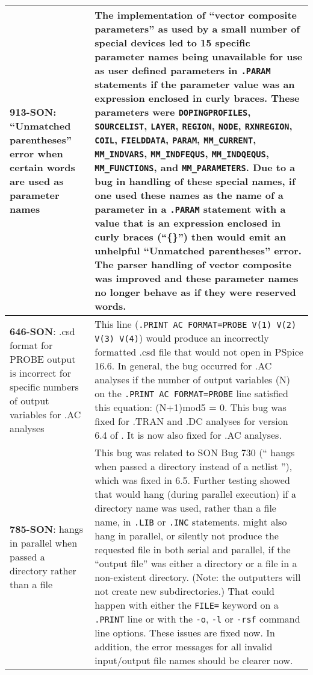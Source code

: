 {\begin{longtable}[h] {>{\raggedright\small}m{2in}|>{\raggedright\let\\\tabularnewline\small}m{3.5in}}
     \textbf{913-SON}: ``Unmatched parentheses'' error when certain words are
     used as parameter names & The implementation of ``vector composite
     parameters'' as used by a small number of special devices led to 15
     specific parameter names being unavailable for use as user defined
     parameters in \texttt{.PARAM} statements if the parameter value was an
     expression enclosed in curly braces.  These parameters were
     \texttt{DOPINGPROFILES}, \texttt{SOURCELIST}, \texttt{LAYER},
     \texttt{REGION}, \texttt{NODE}, \texttt{RXNREGION}, \texttt{COIL},
     \texttt{FIELDDATA}, \texttt{PARAM}, \texttt{MM\_CURRENT},
     \texttt{MM\_INDVARS}, \texttt{MM\_INDFEQUS}, \texttt{MM\_INDQEQUS},
     \texttt{MM\_FUNCTIONS}, and \texttt{MM\_PARAMETERS}.  Due to a bug in
     handling of these special names, if one used these names as the name of a
     parameter in a \texttt{.PARAM} statement with a value that is an
     expression enclosed in curly braces (``\{\}'') then \Xyce{} would emit an
     unhelpful ``Unmatched parentheses'' error.  The parser handling of vector
     composite was improved and these parameter names no longer behave as if
     they were reserved words.  \\ \hline

     \textbf{646-SON}: .csd format for PROBE output is incorrect for specific numbers of 
     output variables for .AC analyses  & This line (\texttt{.PRINT AC FORMAT=PROBE V(1) V(2) V(3) V(4)}) 
     would produce an incorrectly formatted .csd file that would not open in PSpice 16.6. In 
     general, the bug occurred for .AC analyses if the number of output variables (N) 
     on the \texttt{.PRINT AC FORMAT=PROBE} line satisfied this equation: (N+1)mod5 = 0.  
     This bug was fixed for .TRAN and .DC analyses for version 6.4 of \Xyce{}. 
     It is now also fixed for .AC analyses.  \\ \hline

     \textbf{785-SON}: \Xyce{} hangs in parallel when passed a directory rather than a file &
     This bug was related to SON Bug 730 (``\Xyce{} hangs when passed a directory instead of a 
     netlist ''), which was fixed in \Xyce{} 6.5.  Further testing showed that \Xyce{}
     would hang (during parallel execution) if a directory name was used, rather than a file name,
     in \texttt{.LIB} or \texttt{.INC} statements.  \Xyce{} might also hang in parallel, or
     silently not produce the requested file in both serial and parallel, if the ``output file''
     was either a directory or a file in a non-existent directory.  (Note: the \Xyce{}
     outputters will not create new subdirectories.)  That could happen with either the 
     \texttt{FILE=} keyword on a \texttt{.PRINT} line or with the \texttt{-o}, \texttt{-l} 
     or \texttt{-rsf} command line options.  These issues are fixed now.  In addition, the 
     error messages for all invalid input/output file names should be clearer now.  \\ \hline


\end{longtable}}

